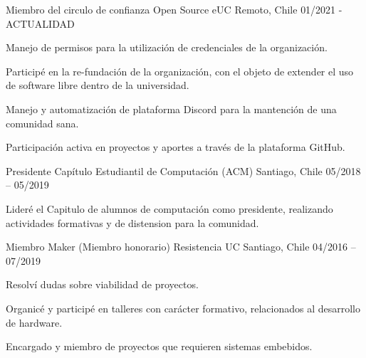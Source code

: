 

\begin{cventries}

  \cventry
    {Miembro del circulo de confianza} %
    {Open Source eUC} %
    {Remoto, Chile} %
    {01/2021 - ACTUALIDAD} %
    {
      \begin{cvitems} %
        \item {Manejo de permisos para la utilización de credenciales de la organización.}
        \item {Participé en la re-fundación de la organización, con el objeto de extender el uso de software libre dentro de la universidad.}
        \item {Manejo y automatización de plataforma Discord para la mantención de una comunidad sana.}
        \item {Participación activa en proyectos y aportes a través de la plataforma GitHub.}
      \end{cvitems}
    }

  \cventry
    {Presidente} %
    {Capítulo Estudiantil de Computación (ACM)} %
    {Santiago, Chile} %
    {05/2018 – 05/2019} %
    {
      \begin{cvitems} %
        \item {Lideré el Capitulo de alumnos de computación como presidente, realizando actividades formativas y de distension para la comunidad.}
      \end{cvitems}
    }


  \cventry
    {Miembro Maker (Miembro honorario)} %
    {Resistencia UC} %
    {Santiago, Chile} %
    {04/2016 – 07/2019} %
    {
      \begin{cvitems} %
        \item {Resolví dudas sobre viabilidad de proyectos.}
        \item {Organicé y participé en talleres con carácter formativo, relacionados al desarrollo de hardware.}
        \item {Encargado y miembro de proyectos que requieren sistemas embebidos.}
      \end{cvitems}
    }


\end{cventries}
